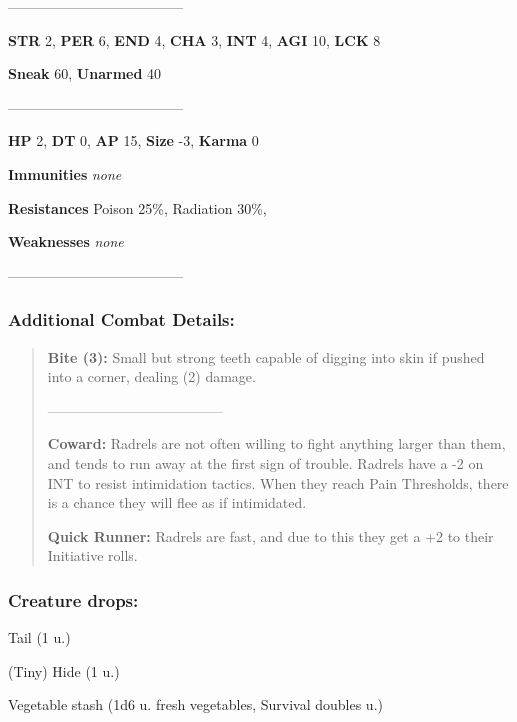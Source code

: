 \documentclass[11pt,a4paper,twocolumn]{book}
\begin{document}
	--------------------------------------

\noindent
\textbf{STR} 2, \textbf{PER} 6, \textbf{END} 4, \textbf{CHA} 3, \textbf{INT} 4, \textbf{AGI} 10, \textbf{LCK} 8

\noindent
\textbf{Sneak} 60, \textbf{Unarmed} 40 %

--------------------------------------

\noindent
\textbf{HP} 2, \textbf{DT} 0, \textbf{AP} 15, \textbf{Size} -3, \textbf{Karma} 0


\noindent
\textbf{Immunities} \emph{none} %

\noindent
\textbf{Resistances} Poison 25\%, Radiation 30\%,%

\noindent
\textbf{Weaknesses} \emph{none}%

--------------------------------------
	
	\subsubsection*{Additional Combat Details:}
	\begin{verse}
		\textbf{Bite (3):} Small but strong teeth capable of digging into skin if pushed into a corner, dealing (2) damage.
		
--------------------------------------
				
		\textbf{Coward:} Radrels are not often willing to fight anything larger than them, and tends to run away at the first sign of trouble. Radrels have a -2 on INT to resist intimidation tactics. When they reach Pain Thresholds, there is a chance they will flee as if intimidated.
		
		\textbf{Quick Runner:} Radrels are fast, and due to this they get a +2 to their Initiative rolls.
		
%		
	\end{verse}
	
	\subsubsection*{Creature drops:}
	\begin{compactitem}
		\item Tail (1 u.)
		\item (Tiny) Hide (1 u.)
		\item Vegetable stash (1d6 u. fresh vegetables, Survival doubles u.)
	\end{compactitem}
	
\end{document}
